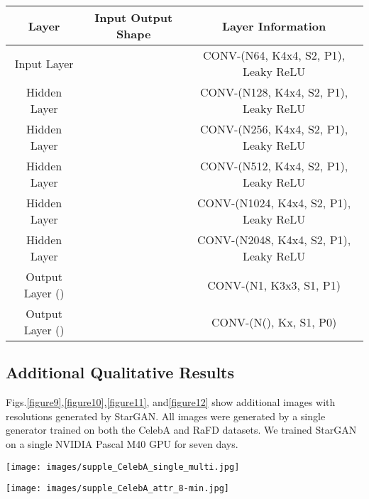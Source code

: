 \documentclass[10pt,twocolumn,letterpaper]{article}
\begin{document}
\medskip

\begin{table*}[h]
\setlength{\tabcolsep}{15pt}
\renewcommand{\arraystretch}{1.7}
\begin{center}
\begin{tabular}{c c c}
Layer & Input  Output Shape & Layer Information \\
\hline \hline
Input Layer &  & CONV-(N64, K4x4, S2, P1), Leaky ReLU \\
\Xhline{1.0pt}
Hidden Layer &  & CONV-(N128, K4x4, S2, P1), Leaky ReLU \\
Hidden Layer &  & CONV-(N256, K4x4, S2, P1), Leaky ReLU \\
Hidden Layer &  & CONV-(N512, K4x4, S2, P1), Leaky ReLU \\
Hidden Layer &  & CONV-(N1024, K4x4, S2, P1), Leaky ReLU \\
Hidden Layer &  & CONV-(N2048, K4x4, S2, P1), Leaky ReLU \\
\Xhline{1.0pt}
Output Layer () &  & CONV-(N1, K3x3, S1, P1) \\
Output Layer () &  & CONV-(N(), Kx, S1, P0) \\
\hline \hline
\end{tabular}
\end{center}
\caption{Discriminator network architecture}
\label{table6}
\end{table*}

\medskip
\subsection{Additional Qualitative Results} 
Figs.\thinspace\ref{figure9},\thinspace\ref{figure10},\thinspace\ref{figure11}, and\thinspace\ref{figure12} show additional images with  resolutions generated by StarGAN. All images were generated by a single generator trained on both the CelebA and RaFD datasets. We trained StarGAN on a single NVIDIA Pascal M40 GPU for seven days.
\begin{figure*}[h]
\centering
\centerline{\texttt{[image: images/supple\_CelebA\_single\_multi.jpg]}}
\caption{Single and multiple attribute transfer on CelebA (Input, Black hair, Blond hair, Brown hair, Gender, Aged, Hair color + Gender, Hair color + Aged, Gender + Aged, Hair color + Gender + Aged).}
\label{figure9}
\end{figure*}

\begin{figure*}[h]
\centering
\centerline{\texttt{[image: images/supple\_CelebA\_attr\_8-min.jpg]}}
\caption{Single attribute transfer on CelebA (Input, Black hair, Blond hair, Brown hair, Gender, Mouth, Pale skin, Rose cheek, Aged).}
\label{figure10}
\end{figure*}
\end{document}
